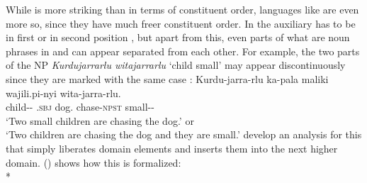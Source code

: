 \documentclass[output=paper,biblatex,babelshorthands,newtxmath,draftmode,colorlinks,citecolor=brown]{langscibook}
\begin{document}
While  is more striking than  in terms of constituent order, languages like
 are even more so, since they have much freer constituent order. In
 the auxiliary has to be in first or in second position \parencites[]{Laughren89a-u}[, 99]{Simpson91a-u}, %
but apart from this, even parts of what are noun
phrases in  and  can appear separated from each other. For example, the two parts of
the NP \emph{Kurdujarrarlu witajarrarlu} `child small' may appear discontinuously since they are marked with
the same case \citep[]{Simpson91a-u}:
\ea
\label{ex-warlpiri}
\gll Kurdu-jarra-rlu  ka-pala                 maliki     wajili.pi-nyi        wita-jarra-rlu.\\
     child-\DU-\ERG{} \DU.\textsc{sbj} dog.\ABS{} chase-\textsc{npst} small-\DU-\ERG\\%
\glt `Two small children are chasing the dog.' or\\
     `Two children are chasing the dog and they are small.'
\z
%
\citet{DS99a} develop an analysis for this that simply liberates domain elements and inserts them
into the next higher domain. () shows how this is formalized:
\ea
{} \impl\\*
\end{document}
